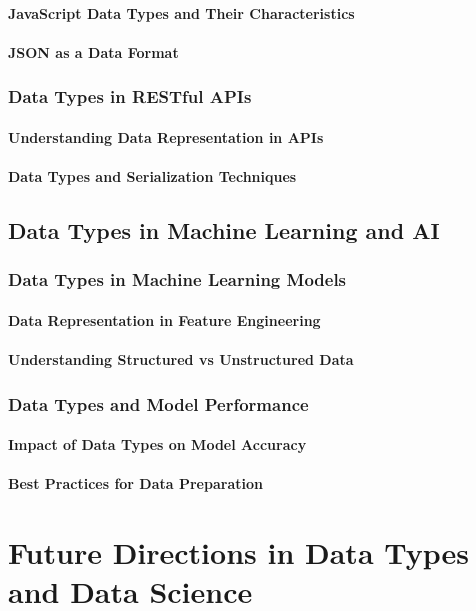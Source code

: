 \documentclass[12pt, oneside]{book}
\begin{document}
\subsubsection{JavaScript Data Types and Their Characteristics}
\subsubsection{JSON as a Data Format}
\subsection{Data Types in RESTful APIs}
\subsubsection{Understanding Data Representation in APIs}
\subsubsection{Data Types and Serialization Techniques}
\section{Data Types in Machine Learning and AI}
\subsection{Data Types in Machine Learning Models}
\subsubsection{Data Representation in Feature Engineering}
\subsubsection{Understanding Structured vs Unstructured Data}
\subsection{Data Types and Model Performance}
\subsubsection{Impact of Data Types on Model Accuracy}
\subsubsection{Best Practices for Data Preparation}

\chapter{Future Directions in Data Types and Data Science}
\end{document}
